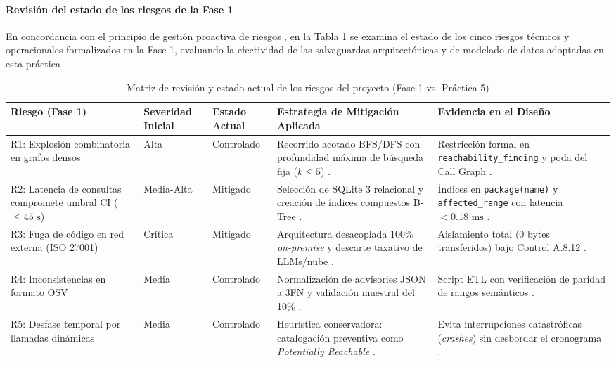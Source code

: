 \paragraph*{Revisión del estado de los riesgos de la Fase 1}
En concordancia con el principio de gestión proactiva de riesgos \cite{pmi2021pmbok, pressman2020software}, en la Tabla \ref{p6:tab:revision_riesgos} se examina el estado de los cinco riesgos técnicos y operacionales formalizados en la Fase 1, evaluando la efectividad de las salvaguardas arquitectónicas y de modelado de datos adoptadas en esta práctica \cite{torres2026proyecto}.

\begin{table}[H]
\centering
\caption{Matriz de revisión y estado actual de los riesgos del proyecto (Fase 1 vs. Práctica 5)}
\label{p6:tab:revision_riesgos}
\footnotesize
\singlespacing
\setlength{\tabcolsep}{3.5pt}
\begin{tabularx}{\textwidth}{>{\raggedright\arraybackslash}p{2.6cm} >{\centering\arraybackslash}p{1.8cm} >{\centering\arraybackslash}p{1.9cm} >{\raggedright\arraybackslash}p{5.2cm} >{\raggedright\arraybackslash}X}
\toprule
\textbf{Riesgo (Fase 1)} & \textbf{Severidad Inicial} & \textbf{Estado Actual} & \textbf{Estrategia de Mitigación Aplicada} & \textbf{Evidencia en el Diseño} \\
\midrule
R1: Explosión combinatoria en grafos densos & Alta & Controlado & Recorrido acotado BFS/DFS con profundidad máxima de búsqueda fija ($k \le 5$) \cite{hagberg2008exploring}. & Restricción formal en \texttt{reachability\_\allowbreak finding} y poda del Call Graph \cite{salis2021pycg}. \\
\addlinespace
R2: Latencia de consultas compromete umbral CI ($\le 45\text{ s}$) & Media-Alta & Mitigado & Selección de SQLite 3 relacional y creación de índices compuestos B-Tree \cite{openssf2023osv}. & Índices en \texttt{package(name)} y \texttt{affected\_\allowbreak range} con latencia $<0.18\text{ ms}$ \cite{torres2026proyecto}. \\
\addlinespace
R3: Fuga de código en red externa (ISO 27001) & Crítica & Mitigado & Arquitectura desacoplada 100\% \textit{on-premise} y descarte taxativo de LLMs/nube \cite{ladisa2023sok}. & Aislamiento total (0 bytes transferidos) bajo Control A.8.12 \cite{gutierrez2024auditoria}. \\
\addlinespace
R4: Inconsistencias en formato OSV & Media & Controlado & Normalización de advisories JSON a 3FN y validación muestral del 10\% \cite{openssf2023osv}. & Script ETL con verificación de paridad de rangos semánticos \cite{torres2026proyecto}. \\
\addlinespace
R5: Desfase temporal por llamadas dinámicas & Media & Controlado & Heurística conservadora: catalogación preventiva como \textit{Potentially Reachable} \cite{pashchenko2022vuln4real}. & Evita interrupciones catastróficas (\textit{crashes}) sin desbordar el cronograma \cite{nielson1999principles}. \\
\bottomrule
\end{tabularx}
\end{table}

